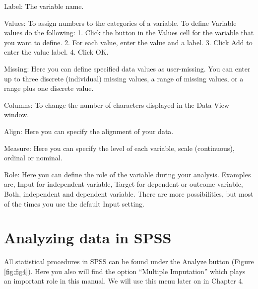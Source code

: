 \documentclass[]{book}
\theoremstyle{definition}
\theoremstyle{definition}
\theoremstyle{definition}
\theoremstyle{remark}
\begin{document}
Label: The variable name.

Values: To assign numbers to the categories of a variable. To define
Variable values do the following: 1. Click the button in the Values cell
for the variable that you want to define. 2. For each value, enter the
value and a label. 3. Click Add to enter the value label. 4. Click OK.

Missing: Here you can define specified data values as user-missing. You
can enter up to three discrete (individual) missing values, a range of
missing values, or a range plus one discrete value.

Columns: To change the number of characters displayed in the Data View
window.

Align: Here you can specify the alignment of your data.

Measure: Here you can specify the level of each variable, scale
(continuous), ordinal or nominal.

Role: Here you can define the role of the variable during your analysis.
Examples are, Input for independent variable, Target for dependent or
outcome variable, Both, independent and dependent variable. There are
more possibilities, but most of the times you use the default Input
setting.

\section{Analyzing data in SPSS}\label{analyzing-data-in-spss}

All statistical procedures in SPSS can be found under the Analyze button
(Figure \ref{fig:fig4}). Here you also will find the option ``Multiple
Imputation'' which plays an important role in this manual. We will use
this menu later on in Chapter 4.
\end{document}
